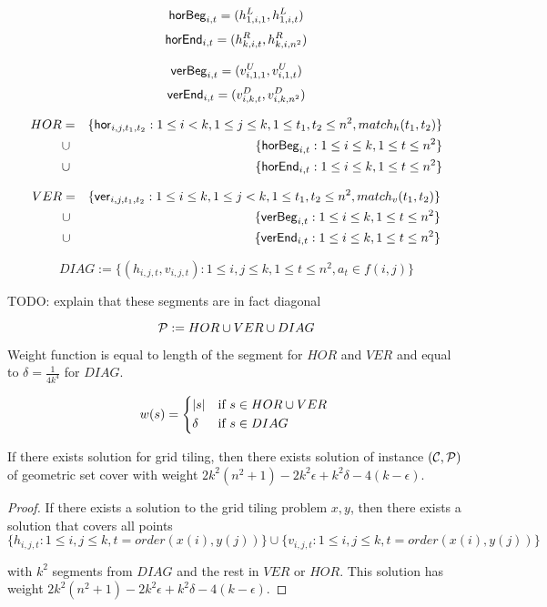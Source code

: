 $$\mathsf{horBeg}_{i,t} = (h^L_{1, i, 1}, h^L_{1, i, t})$$
$$\mathsf{horEnd}_{i,t} = (h^R_{k, i, t}, h^R_{k, i, n^2})$$

$$\mathsf{verBeg}_{i,t} = (v^U_{i, 1, 1}, v^U_{i, 1, t})$$
$$\mathsf{verEnd}_{i,t} = (v^D_{i, k, t}, v^D_{i, k, n^2})$$

\begin{eqnarray*}
HOR &= &\{\mathsf{hor}_{i,j,t_1,t_2} : 1 \le i < k, 1 \le j \le k,
1 \le t_1, t_2 \le n^2, match_h(t_1, t_2)\} \\
&\cup &\{\mathsf{horBeg}_{i,t} : 1 \le i \le k, 1 \le t \le n^2\}
\\
&\cup &\{\mathsf{horEnd}_{i,t} : 1 \le i \le k, 1 \le t \le n^2\}
\end{eqnarray*}

\begin{eqnarray*}
VER &= &\{\mathsf{ver}_{i,j,t_1,t_2} : 1 \le i \le k, 1 \le j < k,
1 \le t_1, t_2 \le n^2, match_v(t_1, t_2)\} \\
&\cup &\{\mathsf{verBeg}_{i,t} : 1 \le i \le k, 1 \le t \le n^2\}
\\
&\cup &\{\mathsf{verEnd}_{i,t} : 1 \le i \le k, 1 \le t \le n^2\}
\end{eqnarray*}

$$DIAG := \{ (h_{i, j, t}, v_{i, j, t}) :
	1 \le i, j \le k, 1 \le t \le n^2, a_t \in f(i, j)\}$$

TODO: explain that these segments are in fact diagonal

$$\mathcal{P} := HOR \cup VER \cup DIAG$$

Weight function is equal to length of the segment for $HOR$ and $VER$
and equal to $\delta = \frac{1}{4k^4}$ for $DIAG$.

\begin{equation}
w(s) =
	\begin{cases*}
	  |s| 			& if $s \in HOR \cup VER$ \\
	  \delta        & if $s \in DIAG$
	\end{cases*}
\end{equation}

\newcommand{\solWeight}{2k^2(n^2+1) - 2k^2\epsilon +k^2\delta -4(k-\epsilon)}

\begin{lemma}
	If there exists solution for grid tiling,
	then there exists solution of instance $(\mathcal{C}, \mathcal{P})$
	of geometric set cover
	with weight $\solWeight$.
\end{lemma}

\begin{proof}
	If there exists a solution to the grid tiling problem
	$x, y$,
	then there exists a solution that covers
	all points
	$$\{h_{i, j, t} : 1 \le i, j \le k, t=order(x(i), y(j))\}
	\cup \{v_{i, j, t} : 1 \le i, j \le k, t=order(x(i), y(j))\}$$
	
	with $k^2$ segments from $DIAG$
	and the rest in $VER$ or $HOR$.
	This solution has weight $\solWeight$.
\end{proof}


